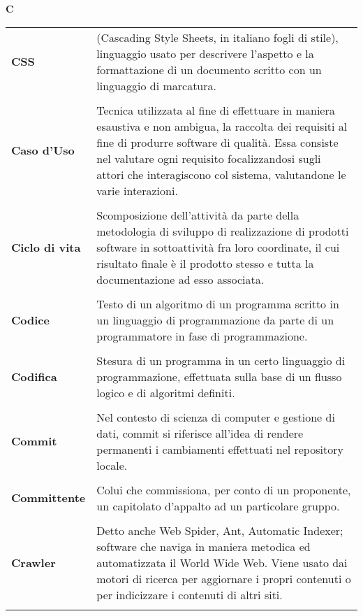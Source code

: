 \newpage 
{} 
{} 
\hfill\Huge{\textbf{C}} \\ 
\normalsize 
\begin{longtable}{L{4cm} p{10cm}}
\textbf{CSS} & (Cascading Style Sheets, in italiano fogli di stile), linguaggio usato per descrivere l’aspetto e la formattazione di un documento scritto con un linguaggio di marcatura. \\ 
 \\ 
\textbf{Caso d'Uso} & Tecnica utilizzata al fine di effettuare in maniera esaustiva e non ambigua, la raccolta dei requisiti al fine di produrre software di qualità. Essa consiste nel valutare ogni requisito focalizzandosi sugli attori che interagiscono col sistema, valutandone le varie interazioni. \\ 
 \\ 
\textbf{Ciclo di vita} & Scomposizione dell'attività da parte della metodologia di sviluppo di realizzazione di prodotti software in sottoattività fra loro coordinate, il cui risultato finale è il prodotto stesso e tutta la documentazione ad esso associata. \\ 
 \\ 
\textbf{Codice} & Testo di un algoritmo di un programma scritto in un linguaggio di programmazione da parte di un programmatore in fase di programmazione. \\ 
 \\ 
\textbf{Codifica} & Stesura di un programma in un certo linguaggio di programmazione, effettuata sulla base di un flusso logico e di algoritmi definiti. \\ 
 \\ 
\textbf{Commit} & Nel contesto di scienza di computer e gestione di dati, commit si riferisce all’idea di rendere permanenti i cambiamenti effettuati nel repository locale. \\ 
 \\ 
\textbf{Committente} & Colui che commissiona, per conto di un proponente, un capitolato d’appalto ad un particolare gruppo. \\ 
 \\ 
\textbf{Crawler} & Detto anche Web Spider, Ant, Automatic Indexer; software che naviga in maniera metodica ed automatizzata il World Wide Web. Viene usato dai motori di ricerca per aggiornare i propri contenuti o per indicizzare i contenuti di altri siti. \\ 
 \\ 
\end{longtable} 
\newpage 
